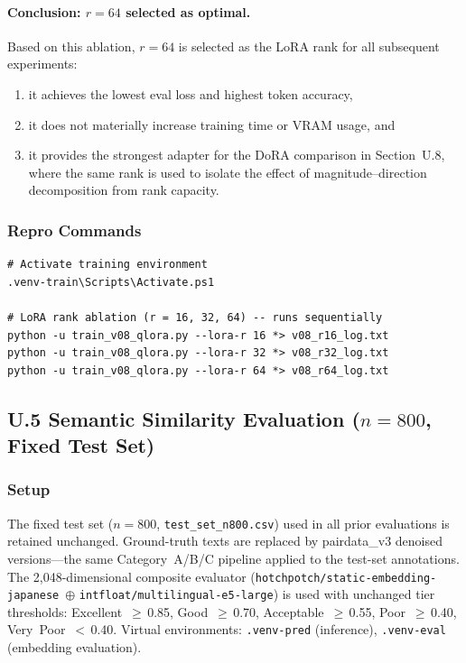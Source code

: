 \documentclass[onecolumn]{article}
\begin{document}
\paragraph{Conclusion: $r = 64$ selected as optimal.}
Based on this ablation, \textbf{$r = 64$} is selected as the LoRA rank for
all subsequent experiments:
\begin{enumerate}[label=(\roman*)]
  \item it achieves the lowest eval loss and highest token accuracy,
  \item it does not materially increase training time or VRAM usage, and
  \item it provides the strongest adapter for the DoRA comparison in
        Section~U.8, where the same rank is used to isolate the effect
        of magnitude--direction decomposition from rank capacity.
\end{enumerate}

\subsubsection*{Repro Commands}

\begin{verbatim}
# Activate training environment
.venv-train\Scripts\Activate.ps1

# LoRA rank ablation (r = 16, 32, 64) -- runs sequentially
python -u train_v08_qlora.py --lora-r 16 *> v08_r16_log.txt
python -u train_v08_qlora.py --lora-r 32 *> v08_r32_log.txt
python -u train_v08_qlora.py --lora-r 64 *> v08_r64_log.txt
\end{verbatim}

\subsection*{U.5 Semantic Similarity Evaluation ($n=800$, Fixed Test Set)}
\label{sec:u5_similarity}

\subsubsection*{Setup}

The fixed test set ($n=800$, \texttt{test\_set\_n800.csv}) used in all
prior evaluations is retained unchanged.
Ground-truth texts are replaced by pairdata\_v3 denoised versions---the
same Category~A/B/C pipeline applied to the test-set annotations.
The 2{,}048-dimensional composite evaluator
(\texttt{hotchpotch/static-embedding-japanese}~$\oplus$
\texttt{intfloat/multilingual-e5-large})
is used with unchanged tier thresholds:
Excellent~$\geq$\,0.85, Good~$\geq$\,0.70, Acceptable~$\geq$\,0.55,
Poor~$\geq$\,0.40, Very~Poor~$<$\,0.40.
Virtual environments: \texttt{.venv-pred} (inference),
\texttt{.venv-eval} (embedding evaluation).
\end{document}
